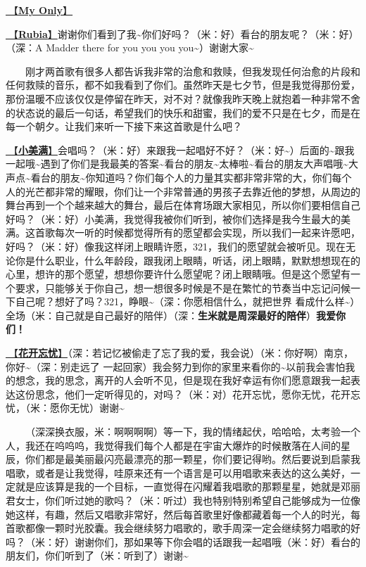\documentclass[]{ctexbook}
\begin{document}
\hyperref[my-only]{🎵【\textbf{My Only}】}

\hyperref[rubia]{🎵【\textbf{Rubia}】}谢谢你们看到了我\textasciitilde 你们好吗？（米：好）看台的朋友呢？（米：好）（深：A Madder there for you you you you\textasciitilde）谢谢大家\textasciitilde{}

  刚才两首歌有很多人都告诉我非常的治愈和救赎，但我发现任何治愈的片段和任何救赎的音乐，都不如我看到了你们。虽然昨天是七夕节，但是我觉得那份爱，那份温暖不应该仅仅是停留在昨天，对不对？就像我昨天晚上就抱着一种非常不舍的状态说的最后一句话，希望我们的快乐和甜蜜，我们的爱不只是在七夕，而是在每一个朝夕。让我们来听一下接下来这首歌是什么吧？

\hyperref[happy-ending]{🎵【\textbf{小美满}】}会唱吗？（米：好）来跟我一起唱好不好？（米：好\textasciitilde）后面的\textasciitilde 跟我一起哦\textasciitilde 遇到了你们是我最美的答案\textasciitilde 看台的朋友\textasciitilde 太棒啦\textasciitilde 看台的朋友大声唱哦\textasciitilde 大声点\textasciitilde 看台的朋友\textasciitilde 你知道吗？你们每个人的力量其实都非常非常的大，你们每个人的光芒都非常的耀眼，你们让一个非常普通的男孩子去靠近他的梦想，从周边的舞台再到一个个越来越大的舞台，最后在体育场跟大家相见，所以你们要相信自己好吗？（米：好）小美满，我觉得我被你们听到，被你们选择是我今生最大的美满。这首歌每次一听的时候都觉得所有的愿望都会实现，所以我们一起来许愿吧，好吗？（米：好）像我这样闭上眼睛许愿，321，我们的愿望就会被听见。现在无论你是什么职业，什么年龄段，跟我闭上眼睛，听话，闭上眼睛，默默想想现在的心里，想许的那个愿望，想想你要许什么愿望呢？闭上眼睛哦。但是这个愿望有一个要求，只能够关于你自己，想一想很多时候是不是在繁忙的节奏当中忘记问候一下自己呢？想好了吗？321，睁眼\textasciitilde（深：你愿相信什么，就把世界 看成什么样\textasciitilde）全场（米：自己就是自己最好的陪伴）（深：\textbf{生米就是周深最好的陪伴}）\textbf{我爱你们！}

\hyperref[no-worries]{🎵【\textbf{花开忘忧}】}（深：若记忆被偷走了忘了我的爱，我会说）（米：你好啊）南京，你好\textasciitilde（深：别走远了 一起回家）我会努力到你的家里来看你的\textasciitilde 以前我会害怕我的想念，我的思念，离开的人会听不见，但是现在我好幸运有你们愿意跟我一起表达这份思念，他们一定听得见的，对吗？（米：对）花开忘忧，愿你无忧，花开忘忧，（米：愿你无忧）谢谢\textasciitilde{}

  （深深换衣服，米：啊啊啊啊）等一下，我的情绪起伏，哈哈哈，太考验一个人，我还在呜呜呜，我觉得我们每个人都是在宇宙大爆炸的时候散落在人间的星辰，你们都是最美丽最闪亮最漂亮的那一颗星，你们要记得哟。然后要说到启蒙我唱歌，或者是让我觉得，哇原来还有一个语言是可以用唱歌来表达的这么美好，一定就是应该算是我的一个目标，一直觉得在闪耀着我唱歌的那颗星星，她就是邓丽君女士，你们听过她的歌吗？（米：听过）我也特别特别希望自己能够成为一位像她这样，有趣，然后又唱歌非常好，然后每首歌里好像都藏着每一个人的时光，每首歌都像一颗时光胶囊。我会继续努力唱歌的，歌手周深一定会继续努力唱歌的好吗？（米：好）谢谢你们，那如果等下你会唱的话跟我一起唱哦（米：好）看台的朋友们，你们听到了（米：听到了）谢谢\textasciitilde{}
\end{document}

